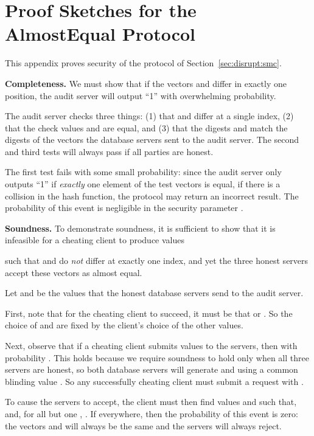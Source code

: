 \documentclass[10pt,twocolumn]{article}
\newcommand{\nicepara}[1]{\medskip\noindent\textbf{#1.}}
\begin{document}
 

\section{Proof Sketches for the\\{\sf AlmostEqual} Protocol}
\label{app:almostequal}

This appendix proves security of the  protocol 
of Section~\ref{sec:disrupt:smc}.

\nicepara{Completeness}
We must show that 
if the vectors  and  differ
in exactly one position, the audit server will output ``1''
with overwhelming probability.

The audit server checks three things:
(1) that  and  differ at a single index, 
(2) that the check values  and  are equal, and
(3) that the digests  and  match the digests
of the vectors the database servers sent to the audit server.
The second and third tests will always pass if all parties are honest.

The first test fails with some small probability:
since the audit server only outputs ``1'' if {\em exactly}
one element of the test vectors is equal, if there
is a collision in the hash function, the
protocol may return an incorrect result.
The probability of this event is negligible
in the security parameter .

\nicepara{Soundness}
To demonstrate soundness, it is sufficient to show that it is infeasible
for a cheating client to produce values

such that  and  do {\em not} differ at exactly one index, and
yet the three honest servers accept these vectors as almost equal.

Let  and  
be the values that the honest database servers send 
to the audit server.

First, note that for the cheating client to succeed, it must be that
 or .
So the choice of  and  are fixed by the client's choice
of the other values.

Next, observe that if a cheating client submits values  to
the servers, then  with probability .
This holds because we require soundness to hold only when all three
servers are honest, so both database servers will generate
 and  using a common blinding value .
So any successfully cheating client must submit a request with
.

To cause the servers to accept, the client must then find values 
 and  such that,
 and, for all but one , 
.
If  everywhere, then the probability of this event is zero:
the vectors  and  will always be the same and the servers will
always reject.
\end{document}
